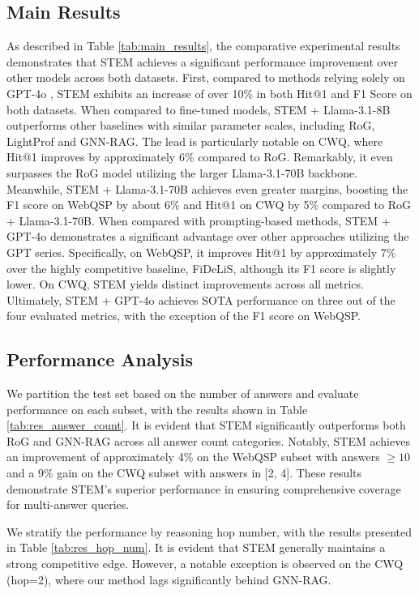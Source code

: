 \documentclass[11pt]{article}
\begin{document}
\subsection{Main Results}
As described in Table \ref{tab:main_results}, the comparative experimental results demonstrates that STEM achieves a significant performance improvement over other models across both datasets. First, compared to methods relying solely on GPT-4o \cite{openai2024gpt4osystemcard}, STEM exhibits an increase of over 10\% in both Hit@1 and F1 Score on both datasets. When compared to fine-tuned models, STEM + Llama-3.1-8B outperforms other baselines with similar parameter scales, including RoG, LightProf and GNN-RAG. The lead is particularly notable on CWQ, where Hit@1 improves by approximately 6\% compared to RoG. Remarkably, it even surpasses the RoG model utilizing the larger Llama-3.1-70B backbone. Meanwhile, STEM + Llama-3.1-70B achieves even greater margins, boosting the F1 score on WebQSP by about 6\% and Hit@1 on CWQ by 5\% compared to RoG + Llama-3.1-70B. When compared with prompting-based methods, STEM + GPT-4o demonstrates a significant advantage over other approaches utilizing the GPT series. Specifically, on WebQSP, it improves Hit@1 by approximately 7\% over the highly competitive baseline, FiDeLiS, although its F1 score is slightly lower. On CWQ, STEM yields distinct improvements across all metrics. Ultimately, STEM + GPT-4o achieves SOTA performance on three out of the four evaluated metrics, with the exception of the F1 score on WebQSP.

\subsection{Performance Analysis}
\label{sec:perform_ana}

We partition the test set based on the number of answers and evaluate performance on each subset, with the results shown in Table \ref{tab:res_answer_count}. It is evident that STEM significantly outperforms both RoG and GNN-RAG across all answer count categories. Notably, STEM achieves an improvement of approximately 4\% on the WebQSP subset with answers
$\geq 10$ and a 9\% gain on the CWQ subset with answers in [2, 4]. These results demonstrate STEM's superior performance in ensuring comprehensive coverage for multi-answer queries.

We stratify the performance by reasoning hop number, with the results presented in Table \ref{tab:res_hop_num}. It is evident that STEM generally maintains a strong competitive edge. However, a notable exception is observed on the CWQ (hop=2), where our method lags significantly behind GNN-RAG.
\end{document}
